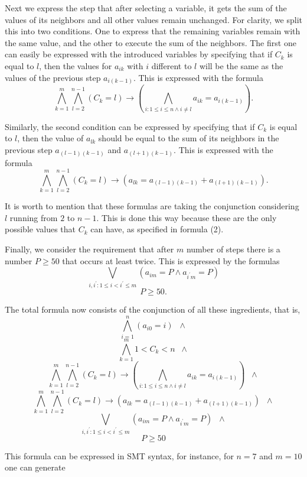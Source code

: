 Next we express the step that after selecting a variable, it gets the sum of the values of its neighbors and all other values remain unchanged. For clarity, we split this into two conditions. One to express that the remaining variables remain with the same value, and the other to execute the sum of the neighbors. The first one can easily be expressed with the introduced variables by specifying that if $C_k$ is equal to $l$, then the values for $a_{ik}$ with $i$ different to $l$ will be the same as the values of the previous step $a_{i(k-1)}$. This is expressed with the formula
\[ \bigwedge_{k=1}^{m} \bigwedge_{l=2}^{n-1}(C_k = l) \rightarrow (\bigwedge_{i: 1 \leq i \leq n \wedge i \neq l} a_{ik} = a_{i(k-1)}).\]

Similarly, the second condition can be expressed by specifying that if $C_k$ is equal to $l$, then the value of $a_{lk}$ should be equal to the sum of its neighbors in the previous step $a_{(l-1)(k-1)}$ and $a_{(l+1)(k-1)}$. This is expressed with the formula
\[ \bigwedge_{k=1}^{m} \bigwedge_{l=2}^{n-1}(C_k = l) \rightarrow (a_{lk} = a_{(l-1)(k-1)} + a_{(l+1)(k-1)}).\]

It is worth to mention that these formulas are taking the conjunction considering $l$ running from $2$ to $n-1$. This is done this way because these are the only possible values that $C_k$ can have, as specified in formula (2).

Finally, we consider the requirement that after $m$ number of steps there is a number $P \geq 50$ that occurs at least twice. This is expressed by the formulas
\[ \bigvee_{i,i^{\prime}: 1\leq i < i^{\prime} \leq m} (a_{im} = P \wedge a_{i^{\prime} m} = P)\]
\[ P \geq 50.\]

The total formula now consists of the conjunction of all these
ingredients, that is,
\[ \bigwedge_{i=1}^n (a_{i0} = i) \;\;\wedge\]
\[ \bigwedge_{k=1}^m 1<C_k<n \;\;\wedge\]
\[ \bigwedge_{k=1}^{m} \bigwedge_{l=2}^{n-1}(C_k = l) \rightarrow (\bigwedge_{i: 1 \leq i \leq n \wedge i \neq l} a_{ik} = a_{i(k-1)}) \;\;\wedge\]
\[ \bigwedge_{k=1}^{m} \bigwedge_{l=2}^{n-1}(C_k = l) \rightarrow (a_{lk} = a_{(l-1)(k-1)} + a_{(l+1)(k-1)}) \;\;\wedge\]
\[ \bigvee_{i,i^{\prime}: 1\leq i < i^{\prime} \leq m} (a_{im} = P \wedge a_{i^{\prime} m} = P) \;\;\wedge\]
\[ P \geq 50\]

This formula can be expressed in SMT syntax, for instance, for $n=7$ and $m=10$ one can generate

